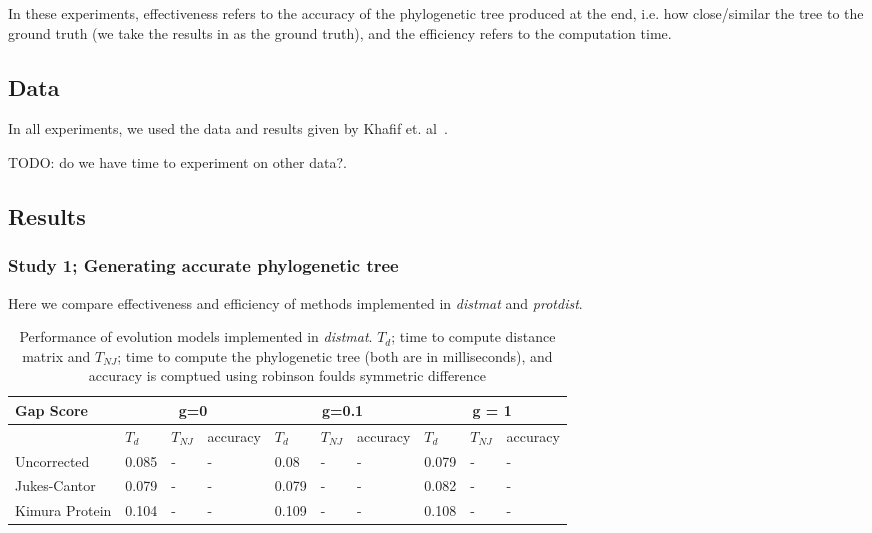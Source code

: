 \documentclass[11pt,letterpaper]{article}
\theoremstyle{definition}
\begin{document}
In these experiments, effectiveness refers to the accuracy of the phylogenetic tree produced at the end, i.e. how close/similar the tree to the ground truth (we take the results in \cite{khafif2014identification} as the ground truth), and the efficiency refers to the computation time. 

\subsection{Data}

In all experiments, we used the data and results given by Khafif et. al~\cite{khafif2014identification}. 

TODO: do we have time to experiment on other data?. 

\subsection{Results}

\subsubsection{Study 1; Generating accurate phylogenetic tree}

Here we compare effectiveness and efficiency of methods implemented in \textit{distmat} and \textit{protdist}. 

\begin{table}[!h]
\centering
	\begin{tabular}{l|lll|lll|lll}

Gap Score	& \multicolumn{3}{c}{g=0} & \multicolumn{3}{c}{g=0.1} &  \multicolumn{3}{c}{g = 1} \\
\hline
&	$T_d$	& $T_{NJ}$	& accuracy &	$T_d$	& $T_{NJ}$	& accuracy &	$T_d$	& $T_{NJ}$	& accuracy \\
\hline
Uncorrected		&	0.085	&	-	&	-	&	0.08	&	-	&	-	&	0.079	&	-	&	-	\\
Jukes-Cantor	&	0.079	&	-	&	-	&	0.079	&	-	&	-	&	0.082	&	-	&	-	\\
Kimura Protein	&	0.104	&	-	&	-	&	0.109	&	-	&	-	&	0.108	&	-	&	-	\\
\hline
\end{tabular}
\caption{Performance of evolution models implemented in \textit{distmat}. 
$T_d$; time to compute distance matrix and $T_{NJ}$; time to compute the phylogenetic tree (both are in milliseconds), and accuracy is comptued using robinson foulds symmetric difference}\label{tab:dist1}
\end{table}
\end{document}
